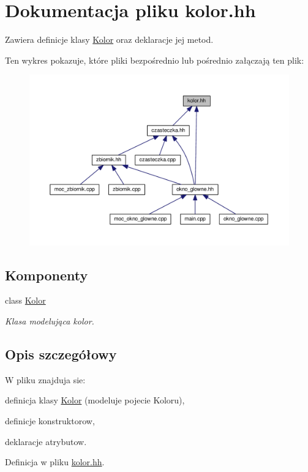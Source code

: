 \hypertarget{kolor_8hh}{\section{Dokumentacja pliku kolor.\-hh}
\label{kolor_8hh}
}


Zawiera definicje klasy \hyperlink{class_kolor}{Kolor} oraz deklaracje jej metod.  


Ten wykres pokazuje, które pliki bezpośrednio lub pośrednio załączają ten plik\-:
\nopagebreak
\begin{figure}[H]
\begin{center}
\leavevmode
\includegraphics[width=350pt]{kolor_8hh__dep__incl}
\end{center}
\end{figure}
\subsection*{Komponenty}
\begin{DoxyCompactItemize}
\item 
class \hyperlink{class_kolor}{Kolor}
\begin{DoxyCompactList}\small\item\em Klasa modelująca kolor. \end{DoxyCompactList}\end{DoxyCompactItemize}


\subsection{Opis szczegółowy}
W pliku znajduja sie\-:
\begin{DoxyItemize}
\item definicja klasy \hyperlink{class_kolor}{Kolor} (modeluje pojecie Koloru),
\item definicje konstruktorow,
\item deklaracje atrybutow. 
\end{DoxyItemize}

Definicja w pliku \hyperlink{kolor_8hh_source}{kolor.\-hh}.


